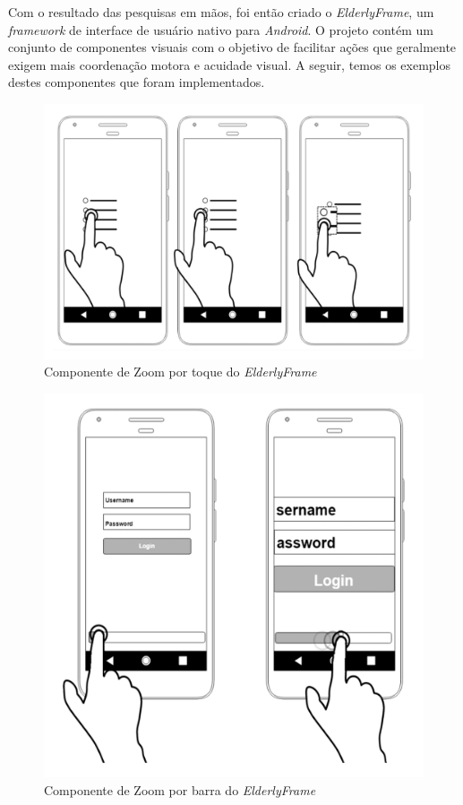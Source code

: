 \documentclass[
	12pt,				    %
	openright,			    %
	oneside,			    %
	a4paper,			    %
    sumario=tradicional,    %
	english,			    %
	brazil,				    %
	]{abntex2}              %
\begin{document}
\par

Com o resultado das pesquisas em mãos, foi então criado o \textit{ElderlyFrame}\cite{elderlyframe}, um \textit{framework} de interface de usuário nativo para \textit{Android}. O projeto contém um conjunto de componentes visuais com o objetivo de facilitar ações que geralmente exigem mais coordenação motora e acuidade visual. A seguir, temos os exemplos destes componentes que foram implementados.

\begin{figure}[H]
	\begin{center}
		\includegraphics[height=0.4\linewidth]{images/touchable-zoom.png}
	\end{center}
	\caption[Componente \textit{TouchZoom} do \textit{ElderlyFrame}]{Componente de Zoom por toque do \textit{ElderlyFrame}}
	\label{fig:touchableZoom}
\end{figure}

\begin{figure}[H]
	\begin{center}
		\includegraphics[height=0.5\linewidth]{images/zoom-bar.png}
	\end{center}
	\caption[Componente \textit{SeekBarZoom} do \textit{ElderlyFrame}]{Componente de Zoom por barra do \textit{ElderlyFrame}}
	\label{fig:zoomBar}
\end{figure}
\end{document}

